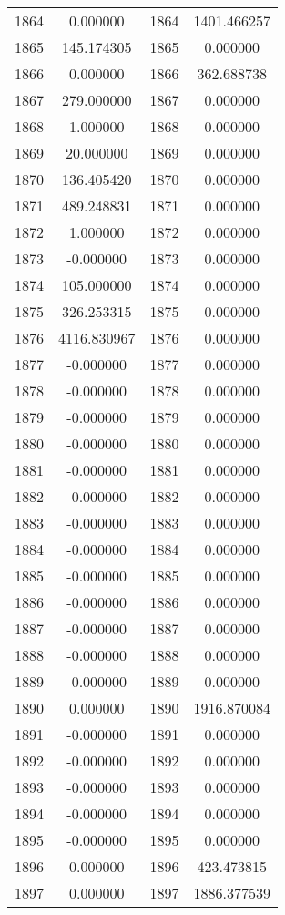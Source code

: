 \documentclass[12pt]{article}
\begin{document}
\begin{longtable}{@{}cccc@{}}
1864 & 0.000000 & 1864 & 1401.466257 \\
1865 & 145.174305 & 1865 & 0.000000 \\
1866 & 0.000000 & 1866 & 362.688738 \\
1867 & 279.000000 & 1867 & 0.000000 \\
1868 & 1.000000 & 1868 & 0.000000 \\
1869 & 20.000000 & 1869 & 0.000000 \\
1870 & 136.405420 & 1870 & 0.000000 \\
1871 & 489.248831 & 1871 & 0.000000 \\
1872 & 1.000000 & 1872 & 0.000000 \\
1873 & -0.000000 & 1873 & 0.000000 \\
1874 & 105.000000 & 1874 & 0.000000 \\
1875 & 326.253315 & 1875 & 0.000000 \\
1876 & 4116.830967 & 1876 & 0.000000 \\
1877 & -0.000000 & 1877 & 0.000000 \\
1878 & -0.000000 & 1878 & 0.000000 \\
1879 & -0.000000 & 1879 & 0.000000 \\
1880 & -0.000000 & 1880 & 0.000000 \\
1881 & -0.000000 & 1881 & 0.000000 \\
1882 & -0.000000 & 1882 & 0.000000 \\
1883 & -0.000000 & 1883 & 0.000000 \\
1884 & -0.000000 & 1884 & 0.000000 \\
1885 & -0.000000 & 1885 & 0.000000 \\
1886 & -0.000000 & 1886 & 0.000000 \\
1887 & -0.000000 & 1887 & 0.000000 \\
1888 & -0.000000 & 1888 & 0.000000 \\
1889 & -0.000000 & 1889 & 0.000000 \\
1890 & 0.000000 & 1890 & 1916.870084 \\
1891 & -0.000000 & 1891 & 0.000000 \\
1892 & -0.000000 & 1892 & 0.000000 \\
1893 & -0.000000 & 1893 & 0.000000 \\
1894 & -0.000000 & 1894 & 0.000000 \\
1895 & -0.000000 & 1895 & 0.000000 \\
1896 & 0.000000 & 1896 & 423.473815 \\
1897 & 0.000000 & 1897 & 1886.377539 \\

\end{longtable}
\end{document}

